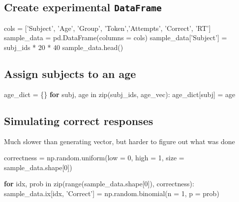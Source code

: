 \documentclass[]{article}
\newenvironment{Shaded}{\begin{snugshade}}{\end{snugshade}}
\newcommand{\KeywordTok}[1]{\textcolor[rgb]{0.13,0.29,0.53}{\textbf{{#1}}}}
\newcommand{\DataTypeTok}[1]{\textcolor[rgb]{0.13,0.29,0.53}{{#1}}}
\newcommand{\DecValTok}[1]{\textcolor[rgb]{0.00,0.00,0.81}{{#1}}}
\newcommand{\StringTok}[1]{\textcolor[rgb]{0.31,0.60,0.02}{{#1}}}
\newcommand{\NormalTok}[1]{{#1}}
\begin{document}
\subsection{\texorpdfstring{Create experimental
\texttt{DataFrame}}{Create experimental DataFrame}}\label{create-experimental-dataframe}

\begin{Shaded}
\begin{Highlighting}[]
\NormalTok{cols = [}\StringTok{'Subject'}\NormalTok{, }\StringTok{'Age'}\NormalTok{, }\StringTok{'Group'}\NormalTok{, }\StringTok{'Token'}\NormalTok{,}\StringTok{'Attempts'}\NormalTok{, }\StringTok{'Correct'}\NormalTok{, }\StringTok{'RT'}\NormalTok{]}
\NormalTok{sample_data = pd.DataFrame(columns = cols)}
\NormalTok{sample_data[}\StringTok{'Subject'}\NormalTok{] = subj_ids * }\DecValTok{20} \NormalTok{* }\DecValTok{40}
\NormalTok{sample_data.head()}
\end{Highlighting}
\end{Shaded}

\subsection{Assign subjects to an age}\label{assign-subjects-to-an-age}

\begin{Shaded}
\begin{Highlighting}[]
\NormalTok{age_dict = \{\}}
\KeywordTok{for} \NormalTok{subj, age in }\DataTypeTok{zip}\NormalTok{(subj_ids, age_vec):}
    \NormalTok{age_dict[subj] = age}
\end{Highlighting}
\end{Shaded}

\subsection{Simulating correct
responses}\label{simulating-correct-responses}

Much slower than generating vector, but harder to figure out what was
done

\begin{Shaded}
\begin{Highlighting}[]
\NormalTok{correctness = np.random.uniform(low = }\DecValTok{0}\NormalTok{, high = }\DecValTok{1}\NormalTok{, size = sample_data.shape[}\DecValTok{0}\NormalTok{])}

\KeywordTok{for} \NormalTok{idx, prob in }\DataTypeTok{zip}\NormalTok{(}\DataTypeTok{range}\NormalTok{(sample_data.shape[}\DecValTok{0}\NormalTok{]), correctness):}
    \NormalTok{sample_data.ix[idx, }\StringTok{'Correct'}\NormalTok{] = np.random.binomial(n = }\DecValTok{1}\NormalTok{, p = prob)}
\end{Highlighting}
\end{Shaded}
\end{document}
